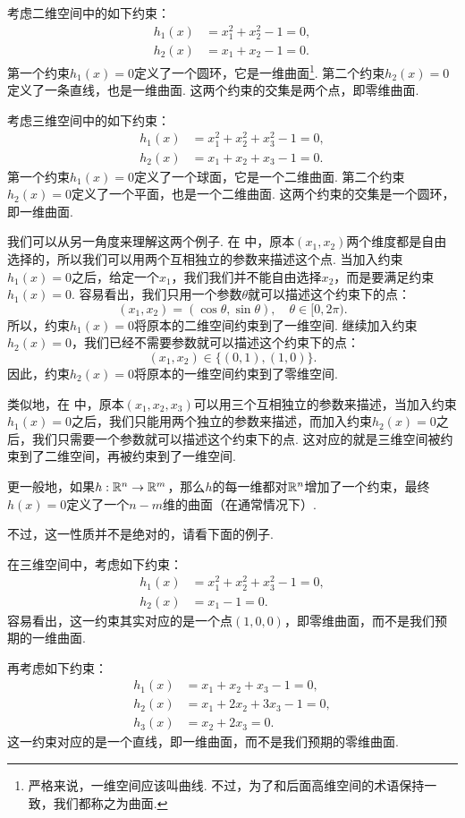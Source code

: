 \begin{example}[二维空间中的约束]\label{example:2d-constraint}
考虑二维空间中的如下约束：
\begin{align*}
    h_1(x)&=x_1^2+x_2^2-1=0,\\
    h_2(x)&=x_1+x_2-1=0.
\end{align*}
第一个约束$h_1(x)=0$定义了一个圆环，它是一维曲面\footnote{严格来说，一维空间应该叫曲线. 不过，为了和后面高维空间的术语保持一致，我们都称之为曲面. }. 第二个约束$h_2(x)=0$定义了一条直线，也是一维曲面. 这两个约束的交集是两个点，即零维曲面.
\end{example}

\begin{example}[三维空间中的约束]\label{example:3d-constraint}
考虑三维空间中的如下约束：
\begin{align*}
    h_1(x)&=x_1^2+x_2^2+x_3^2-1=0,\\
    h_2(x)&=x_1+x_2+x_3-1=0.
\end{align*}
第一个约束$h_1(x)=0$定义了一个球面，它是一个二维曲面. 第二个约束$h_2(x)=0$定义了一个平面，也是一个二维曲面. 这两个约束的交集是一个圆环，即一维曲面.
\end{example}

我们可以从另一角度来理解这两个例子. 在 中，原本$(x_1,x_2)$两个维度都是自由选择的，所以我们可以用两个互相独立的参数来描述这个点. 当加入约束$h_1(x)=0$之后，给定一个$x_1$，我们我们并不能自由选择$x_2$，而是要满足约束$h_1(x)=0$. 容易看出，我们只用一个参数$\theta$就可以描述这个约束下的点：
\[
(x_1,x_2)=(\cos\theta,\sin\theta),\quad \theta\in[0,2\pi).
\]
所以，约束$h_1(x)=0$将原本的二维空间约束到了一维空间. 继续加入约束$h_2(x)=0$，我们已经不需要参数就可以描述这个约束下的点：
\[
(x_1,x_2)\in\{(0,1),(1,0)\}.
\]
因此，约束$h_2(x)=0$将原本的一维空间约束到了零维空间.

类似地，在 中，原本$(x_1,x_2,x_3)$可以用三个互相独立的参数来描述，当加入约束$h_1(x)=0$之后，我们只能用两个独立的参数来描述，而加入约束$h_2(x)=0$之后，我们只需要一个参数就可以描述这个约束下的点. 这对应的就是三维空间被约束到了二维空间，再被约束到了一维空间.

更一般地，如果$h:\mathbb{R}^n\to\mathbb{R}^m$，那么$h$的每一维都对$\mathbb{R}^n$增加了一个约束，最终$h(x)=0$定义了一个$n-m$维的曲面（在通常情况下）. 

不过，这一性质并不是绝对的，请看下面的例子. 

\begin{example}\label{example:3d-constraint-2}
在三维空间中，考虑如下约束：
\begin{align*}
    h_1(x)&=x_1^2+x_2^2+x_3^2-1=0,\\
    h_2(x)&=x_1-1=0.
\end{align*}
容易看出，这一约束其实对应的是一个点$(1,0,0)$，即零维曲面，而不是我们预期的一维曲面.

再考虑如下约束：
\begin{align*}
    h_1(x)&=x_1+x_2+x_3-1=0,\\
    h_2(x)&=x_1+2x_2+3x_3-1=0,\\
    h_3(x)&=x_2+2x_3=0.
\end{align*}
这一约束对应的是一个直线，即一维曲面，而不是我们预期的零维曲面.
\end{example}

